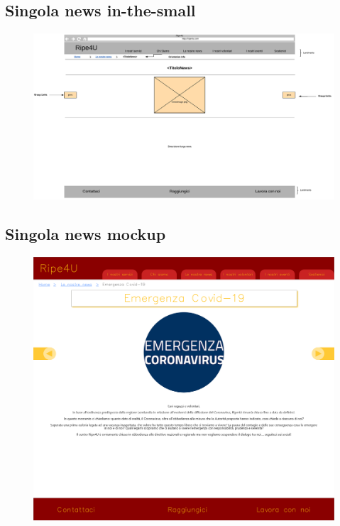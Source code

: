         \subsection{Singola news in-the-small}
        \begin{figure}[H]
            \centering
            \includegraphics[scale=0.37]{resources/images/singolaNews-in-the-small.jpg}
        \end{figure}

        \subsection{Singola news mockup}
        \begin{figure}[H]
            \centering
            \includegraphics[scale=0.18]{resources/images/singolaNews-mockup.png}
        \end{figure}

